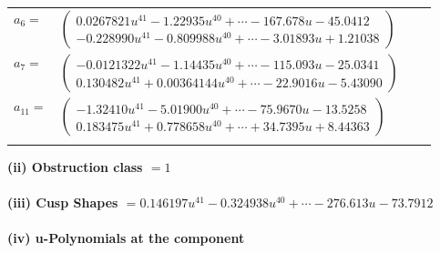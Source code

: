 \documentclass[1p]{elsarticle_modified}
\theoremstyle{definition}
\begin{document}
\begin{tabular}{m{7pt} m{180pt} m{7pt} m{180pt} }
\flushright $a_{6}=$&$\begin{pmatrix}0.0267821 u^{41}-1.22935 u^{40}+\cdots-167.678 u-45.0412\\-0.228990 u^{41}-0.809988 u^{40}+\cdots-3.01893 u+1.21038\end{pmatrix}$ \\
\flushright $a_{7}=$&$\begin{pmatrix}-0.0121322 u^{41}-1.14435 u^{40}+\cdots-115.093 u-25.0341\\0.130482 u^{41}+0.00364144 u^{40}+\cdots-22.9016 u-5.43090\end{pmatrix}$ \\
\flushright $a_{11}=$&$\begin{pmatrix}-1.32410 u^{41}-5.01900 u^{40}+\cdots-75.9670 u-13.5258\\0.183475 u^{41}+0.778658 u^{40}+\cdots+34.7395 u+8.44363\end{pmatrix}$\\&\end{tabular}
\flushleft \textbf{(ii) Obstruction class $= 1$}\\~\\
\flushleft \textbf{(iii) Cusp Shapes $= 0.146197 u^{41}-0.324938 u^{40}+\cdots-276.613 u-73.7912$}\\~\\
\newpage\renewcommand{\arraystretch}{1}
\flushleft \textbf{(iv) u-Polynomials at the component}\newline \\
\end{document}

